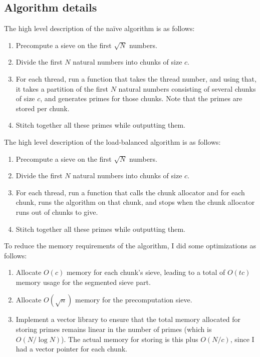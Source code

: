 \documentclass[a4paper]{article}
\begin{document}
\subsection{Algorithm details}

The high level description of the na\"ive algorithm is as follows:

\begin{enumerate}
    \item Precompute a sieve on the first $\sqrt{N}$ numbers.
    \item Divide the first $N$ natural numbers into chunks of size $c$.
    \item For each thread, run a function that takes the thread number, and using that, it takes a partition of the first $N$ natural numbers consisting of several chunks of size $c$, and
        generates primes for those chunks. Note that the primes are stored per chunk.
    \item Stitch together all these primes while outputting them.
\end{enumerate}

The high level description of the load-balanced algorithm is as follows:
\begin{enumerate}
    \item Precompute a sieve on the first $\sqrt{N}$ numbers.
    \item Divide the first $N$ natural numbers into chunks of size $c$.
    \item For each thread, run a function that calls the chunk allocator and for each chunk, runs the algorithm on that chunk, and stops when the chunk allocator runs out of chunks to give.
    \item Stitch together all these primes while outputting them.
\end{enumerate}

To reduce the memory requirements of the algorithm, I did some optimizations as follows:

\begin{enumerate}
    \item Allocate $O(c)$ memory for each chunk's sieve, leading to a total of $O(tc)$ memory usage for the segmented sieve part.
    \item Allocate $O(\sqrt{n})$ memory for the precomputation sieve.
    \item Implement a vector library to ensure that the total memory allocated for storing primes remains linear in the number of primes (which is $O(N / \log N)$). The actual memory for storing
        is this plus $O(N/c)$, since I had a vector pointer for each chunk.
\end{enumerate}
\end{document}
